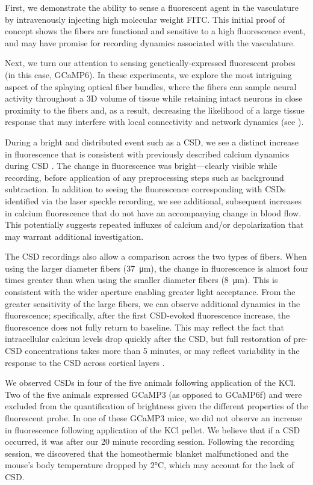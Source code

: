 First, we demonstrate the ability to sense a fluorescent agent in the 
vasculature by intravenously injecting high molecular weight FITC. 
This initial proof of concept shows the fibers are functional and 
sensitive to a high fluorescence event, and may have promise for 
recording dynamics associated with the vasculature.

Next, we turn our attention to sensing genetically-expressed 
fluorescent probes (in this case, GCaMP6). In these experiments, we 
explore the most intriguing aspect of the splaying optical fiber 
bundles, where the fibers can sample neural activity throughout a 3D 
volume of tissue while retaining intact neurons in close proximity to the 
fibers and, as a result, decreasing the likelihood of a large tissue 
response that may interfere with local connectivity and network 
dynamics (see ).

During a bright and distributed event such as a CSD, we see a distinct
 increase in fluorescence that is consistent with previously described
 calcium dynamics during CSD \cite{Gniel:2010jn}. The change in fluorescence 
was bright---clearly visible while recording, before application of 
any preprocessing steps such as background subtraction. In addition to
 seeing the fluorescence corresponding with CSDs identified via the 
laser speckle recording, we see additional, subsequent increases in 
calcium fluorescence that do not have an accompanying change in blood 
flow. This potentially suggests repeated influxes of calcium and/or 
depolarization that may warrant additional investigation.

The CSD recordings also allow a comparison across the two types of 
fibers. When using the larger diameter fibers (37~\si{\micro\meter}), 
the change in fluorescence is almost four times greater than when 
using the smaller diameter fibers (8~\si{\micro\meter}). This is 
consistent with the wider aperture enabling greater light acceptance. 
From the greater sensitivity of the large fibers, we can observe 
additional dynamics in the fluorescence; specifically, after the first
 CSD-evoked fluorescence increase, the fluorescence does not fully 
return to baseline. This may reflect the fact that intracellular 
calcium levels drop quickly after the CSD, but full restoration of 
pre-CSD concentrations takes more than 5 minutes, or may reflect 
variability in the response to the CSD across cortical layers 
\cite{Gniel:2010jn}.

We observed CSDs in four of the five animals following application of 
the KCl. Two of the five animals expressed GCaMP3 (as opposed to 
GCaMP6f) and were excluded from the quantification of brightness given
 the different properties of the fluorescent probe. In one of these 
GCaMP3 mice, we did not observe an increase in fluorescence following 
application of the KCl pellet. We believe that if a CSD occurred, it 
was after our 20 minute recording session. Following the recording 
session, we discovered that the homeothermic blanket malfunctioned and
 the mouse's body temperature dropped by 2\si{\celsius}, which may 
account for the lack of CSD.

